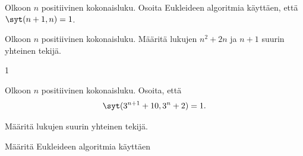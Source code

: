 \begin{tehtava}
    Olkoon $n$ positiivinen kokonaisluku. Osoita Eukleideen algoritmia käyttäen, että $\syt(n+1, n)=1$.
\end{tehtava}

\begin{tehtava}
    Olkoon $n$ positiivinen kokonaisluku. Määritä lukujen $n^2 + 2n$ ja $n + 1$ suurin yhteinen tekijä.
    
    \begin{vastaus}
        1
    \end{vastaus}
    
\end{tehtava}

\begin{tehtava}
    Olkoon $n$ positiivinen kokonaisluku. Osoita, että
    \[\syt(3^{n+1} + 10, 3^n + 2)=1.\]
\end{tehtava}

\begin{tehtava}
    Määritä lukujen suurin yhteinen tekijä.
    
    \begin{alakohdat}
    \end{alakohdat}

    \begin{vastaus}
        \begin{alakohdat}
        \end{alakohdat}
    \end{vastaus}
    
\end{tehtava}

\begin{tehtava}
    Määritä Eukleideen algoritmia käyttäen
    
    \begin{alakohdat}
    \end{alakohdat}

    \begin{vastaus}
        \begin{alakohdat}
        \end{alakohdat}
    \end{vastaus}
    
\end{tehtava}

